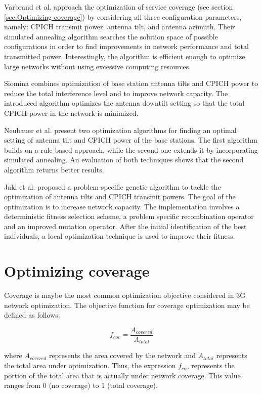 Varbrand et al. \cite{Coverage.optimization.on.CPICH.tilt.and.azimuth:2006}
approach the optimization of service coverage (see section \ref{sec:Optimizing-coverage})
by considering all three configuration parameters, namely: CPICH transmit
power, antenna tilt, and antenna azimuth. Their simulated annealing
algorithm searches the solution space of possible configurations in
order to find improvements in network performance and total transmitted
power. Interestingly, the algorithm is efficient enough to optimize
large networks without using excessive computing resources.

Siomina \cite{CPICH.and.antenna.tilt.optimization:2005} combines
optimization of base station antenna tilts and CPICH power to reduce
the total interference level and to improve network capacity. The
introduced algorithm optimizes the antenna downtilt setting so that
the total CPICH power in the network is minimized.

Neubauer et al. \cite{Antenna.tilt.and.CPICH:2003} present two optimization
algorithms for finding an optimal setting of antenna tilt and CPICH
power of the base stations. The first algorithm builds on a rule-based
approach, while the second one extends it by incorporating simulated
annealing. An evaluation of both techniques shows that the second
algorithm returns better results.

Jakl et al. \cite{GA.for.tilt.and.CPICH:2004} proposed a problem-specific
genetic algorithm to tackle the optimization of antenna tilts and
CPICH transmit powers. The goal of the optimization is to increase
network capacity. The implementation involves a deterministic fitness
selection scheme, a problem specific recombination operator and an
improved mutation operator. After the initial identification of the
best individuals, a local optimization technique is used to improve
their fitness.


\section{Optimizing coverage \label{sec:Optimizing-coverage}}

Coverage is maybe the most common optimization objective considered
in 3G network optimization. The objective function for coverage optimization
may be defined as follows:

\[
f_{cov}=\frac{A_{covered}}{A_{total}}
\]


where $A_{covered}$ represents the area covered by the network and
$A_{total}$ represents the total area under optimization. Thus, the
expression $f_{cov}$ represents the portion of the total area that
is actually under network coverage. This value ranges from 0 (no coverage)
to 1 (total coverage).

